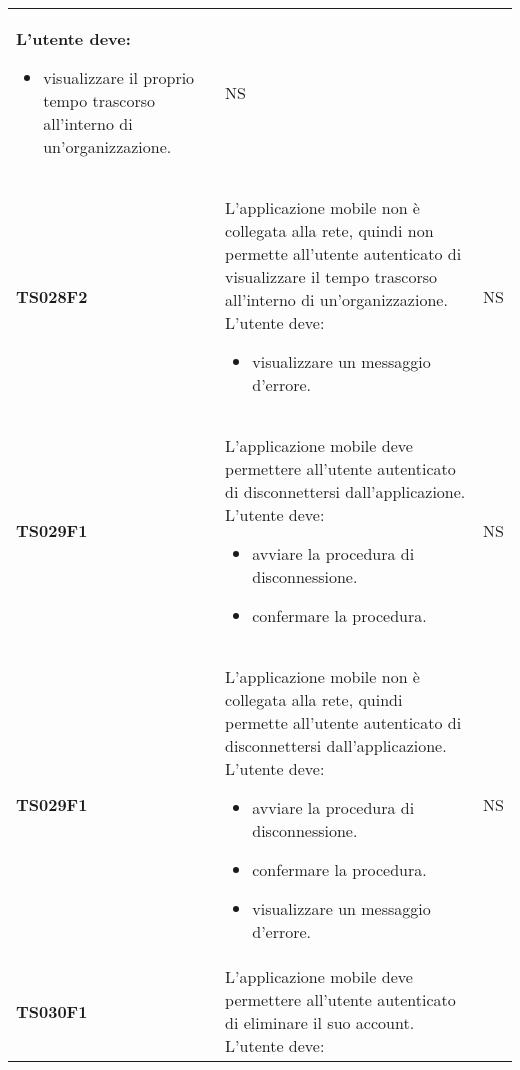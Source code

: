 \documentclass[../piano-di-qualifica.tex]{subfiles}
\begin{document}
\begin{centering}
\begin{longtable}[H]{>{\centering\bfseries}m{3cm} >{}p{10cm} >{\centering\arraybackslash}m{3cm}}
                      L'utente deve:
                        \begin{itemize}
                          \item visualizzare il proprio tempo trascorso all'interno di un'organizzazione.
                        \end{itemize}
                    & NS \\
        TS028F2     & L'applicazione mobile non è collegata alla rete, quindi non permette all'utente autenticato di visualizzare il tempo trascorso all'interno di un'organizzazione. \newline
                      L'utente deve:
                        \begin{itemize}
                          \item visualizzare un messaggio d'errore.
                        \end{itemize}
                    & NS \\
        TS029F1     & L'applicazione mobile deve permettere all'utente autenticato di disconnettersi dall'applicazione. \newline
                      L'utente deve:
                        \begin{itemize}
                          \item avviare la procedura di disconnessione.
                          \item confermare la procedura.
                        \end{itemize}
                    & NS \\
        TS029F1     & L'applicazione mobile non è collegata alla rete, quindi permette all'utente autenticato di disconnettersi dall'applicazione. \newline
                      L'utente deve:
                        \begin{itemize}
                          \item avviare la procedura di disconnessione.
                          \item confermare la procedura.
                          \item visualizzare un messaggio d'errore.
                        \end{itemize}
                    & NS \\
        TS030F1     & L'applicazione mobile deve permettere all'utente autenticato di eliminare il suo account. \newline
                      L'utente deve:

\end{longtable}
\end{centering}
\end{document}
